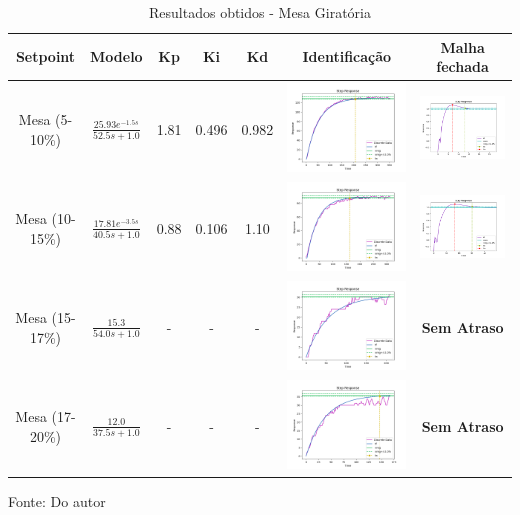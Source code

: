 \begin{table}[H]
    \caption{Resultados obtidos - Mesa Giratória}
    \centering
    \begin{tabular}{|c|c|c|c|c|c|c|}
        \hline
        \textbf{Setpoint} & \textbf{Modelo}                       & \textbf{Kp} & \textbf{Ki} & \textbf{Kd} & \textbf{Identificação} & \textbf{Malha fechada} \\
        \hline
        Mesa (5-10\%)     & $\frac{25.93 e^{-1.5s}}{52.5s + 1.0}$ & 1.81        & 0.496       & 0.982       & \includegraphics[width=0.2\linewidth]{figuras/mesa_5_10} & \includegraphics[width=0.2\linewidth]{figuras/mesa_5_10c} \\
        \hline
        Mesa (10-15\%)    & $\frac{17.81 e^{-3.5s}}{40.5s + 1.0}$ & 0.88        & 0.106       & 1.10        & \includegraphics[width=0.2\linewidth]{figuras/mesa_10_15} & \includegraphics[width=0.2\linewidth]{figuras/mesa_10_15c} \\
        \hline
        Mesa (15-17\%)    & $\frac{15.3}{54.0s + 1.0}$            & -           & -           & -           & \includegraphics[width=0.2\linewidth]{figuras/mesa_15_17} & \textbf{Sem Atraso} \\
        \hline
        Mesa (17-20\%)    & $\frac{12.0}{37.5s + 1.0}$            & -           & -           & -           & \includegraphics[width=0.2\linewidth]{figuras/mesa_17_20} & \textbf{Sem Atraso} \\
        \hline
    \end{tabular}
    \label{tab:results_mesa}
    \vspace{0cm}\hspace{0cm}\small{Fonte: Do autor}
\end{table}


